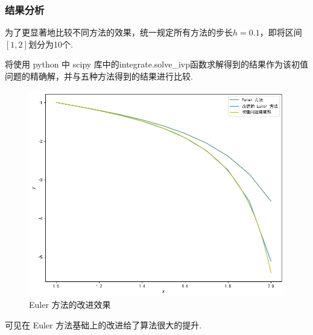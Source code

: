 \documentclass[UTF8,ctexart,a4paper,11pt,openany]{article}
\theoremstyle{definition}
\begin{document}
        \subsubsection{结果分析}%
        为了更显著地比较不同方法的效果，统一规定所有方法的步长$h=0.1$，即将区间$[1, 2]$划分为10个. \par
        
        将使用 python 中 scipy 库中的integrate.solve\_ivp函数求解得到的结果作为该初值问题的精确解，并与五种方法得到的结果进行比较. \par
        \begin{figure}[H]
            \centering
            \includegraphics[width=0.45\linewidth]{pics/P9.1.png}
            \caption{Euler 方法的改进效果}
        \end{figure}

        可见在 Euler 方法基础上的改进给了算法很大的提升. \par
\end{document}
